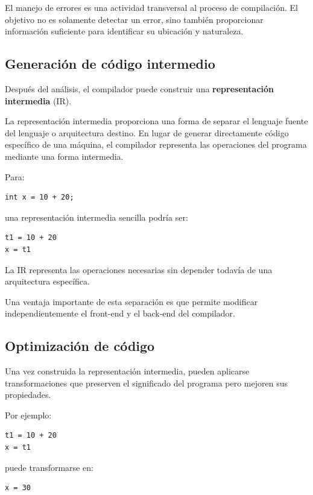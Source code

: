 \documentclass[11pt,a4paper]{article}
\begin{document}
El manejo de errores es una actividad transversal al proceso de compilación.
El objetivo no es solamente detectar un error, sino también proporcionar
información suficiente para identificar su ubicación y naturaleza.

\subsection{Generación de código intermedio}

Después del análisis, el compilador puede construir una
\textbf{representación intermedia} (IR).

La representación intermedia proporciona una forma de separar el lenguaje
fuente del lenguaje o arquitectura destino. En lugar de generar directamente
código específico de una máquina, el compilador representa las operaciones
del programa mediante una forma intermedia.

Para:

\begin{lstlisting}
int x = 10 + 20;
\end{lstlisting}

una representación intermedia sencilla podría ser:

\begin{lstlisting}
t1 = 10 + 20
x = t1
\end{lstlisting}

La IR representa las operaciones necesarias sin depender todavía de una
arquitectura específica.

Una ventaja importante de esta separación es que permite modificar
independientemente el front-end y el back-end del compilador.

\subsection{Optimización de código}

Una vez construida la representación intermedia, pueden aplicarse
transformaciones que preserven el significado del programa pero mejoren sus
propiedades.

Por ejemplo:

\begin{lstlisting}
t1 = 10 + 20
x = t1
\end{lstlisting}

puede transformarse en:

\begin{lstlisting}
x = 30
\end{lstlisting}
\end{document}
